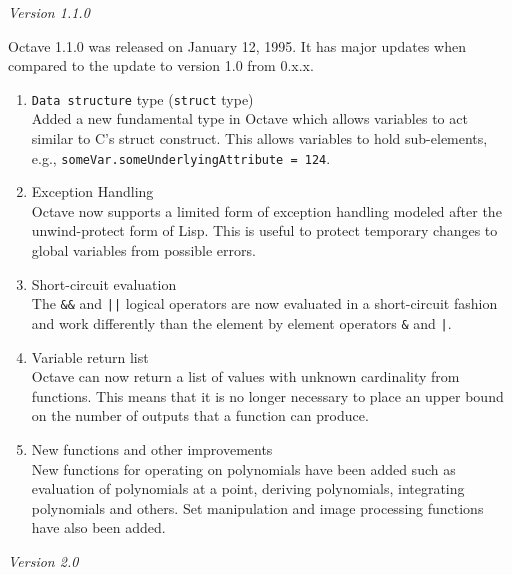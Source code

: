 \documentclass{article}
\begin{document}
\par
\noindent
\textit{Version 1.1.0}

\par
Octave 1.1.0 was released on January 12, 1995. It has major updates when compared to the update to version 1.0 from 0.x.x.
\begin{enumerate}

    \item \texttt{Data structure} type (\texttt{struct} type)\\
    Added a new fundamental type in Octave which allows variables to act similar to C’s struct construct. This allows variables to hold sub-elements, e.g., \texttt{someVar.someUnderlyingAttribute = 124}.

    \item Exception Handling\\
    Octave now supports a limited form of exception handling modeled after the unwind-protect form of Lisp. This is useful to protect temporary changes to global variables from possible errors.

    \item Short-circuit evaluation\\
    The \verb|&&| and \verb!||! logical operators are now evaluated in a short-circuit fashion and work differently than the element by element operators \verb|&| and \verb!|!.

    \item Variable return list\\
    Octave can now return a list of values with unknown cardinality from functions. This means that it is no longer necessary to place an upper bound on the number of outputs that a function can produce.

    \item New functions and other improvements\\
    New functions for operating on polynomials have been added such as evaluation of polynomials at a point, deriving polynomials, integrating polynomials and others. Set manipulation and image processing functions have also been added.

\end{enumerate}

\par
\noindent
\textit{Version 2.0}
\end{document}
